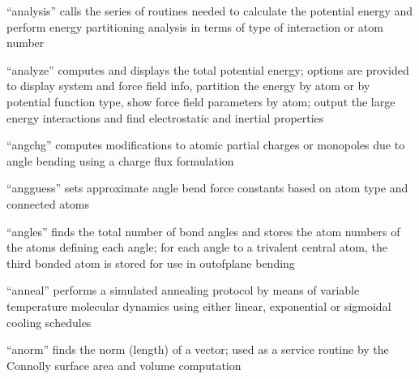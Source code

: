 \documentclass[letterpaper,11pt,english]{sphinxmanual}
\begin{document}
\sphinxAtStartPar
{}

\sphinxAtStartPar
“analysis” calls the series of routines needed to calculate the potential energy and perform energy partitioning analysis in terms of type of interaction or atom number

\sphinxAtStartPar
{}

\sphinxAtStartPar
“analyze” computes and displays the total potential energy; options are provided to display system and force field info, partition the energy by atom or by potential function type, show force field parameters by atom; output the large energy interactions and find electrostatic and inertial properties

\sphinxAtStartPar
{}

\sphinxAtStartPar
“angchg” computes modifications to atomic partial charges or monopoles due to angle bending using a charge flux formulation

\sphinxAtStartPar
{}

\sphinxAtStartPar
“angguess” sets approximate angle bend force constants based on atom type and connected atoms

\sphinxAtStartPar
{}

\sphinxAtStartPar
“angles” finds the total number of bond angles and stores the atom numbers of the atoms defining each angle; for each angle to a trivalent central atom, the third bonded atom is stored for use in out\sphinxhyphen{}of\sphinxhyphen{}plane bending

\sphinxAtStartPar
{}

\sphinxAtStartPar
“anneal” performs a simulated annealing protocol by means of variable temperature molecular dynamics using either linear, exponential or sigmoidal cooling schedules

\sphinxAtStartPar
{}

\sphinxAtStartPar
“anorm” finds the norm (length) of a vector; used as a service routine by the Connolly surface area and volume computation

\sphinxAtStartPar
{}

\sphinxAtStartPar
{}

\sphinxAtStartPar
{}
\end{document}
